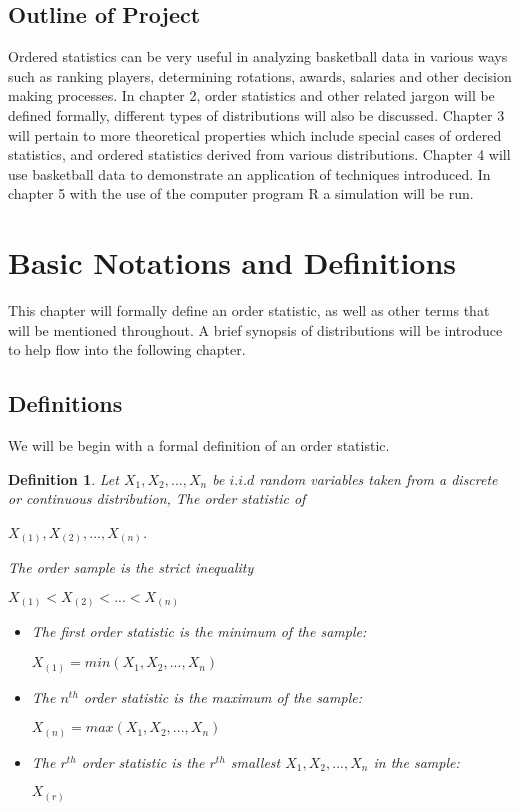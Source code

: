 \documentclass[11pt,a4paper]{article}
\theoremstyle{plain}
\newtheorem{de}[fact]{Definition}
\begin{document}
\subsection{Outline of Project}
Ordered statistics can be very useful in analyzing basketball data in various ways such as ranking players, determining rotations, awards, salaries and other decision making processes. In chapter 2, order statistics and other related jargon will be defined formally, different types of distributions will also be discussed. Chapter 3 will pertain to more theoretical properties which include special cases of ordered statistics, and ordered statistics derived from various distributions. Chapter 4 will use basketball data to demonstrate an application of techniques introduced. In chapter 5 with the use of the computer program R a simulation will be run.

\newpage
\section{Basic Notations and Definitions}
This chapter will formally define an order statistic, as well as other terms that will be mentioned throughout. A brief synopsis of distributions will be introduce to help flow into the following chapter.
\subsection{Definitions}
We will be begin with a formal definition of an order statistic. 
\begin{de}
Let $X_1,X_2,...,X_n$ be $i.i.d$ random variables taken from a discrete or continuous distribution, 
The order statistic of
\begin{center}
 $X_{(1)},X_{(2)},...,X_{(n)}$.
\end{center}
The order sample is the strict inequality
\begin{center}
$X_{(1)}<X_{(2)}<...<X_{(n)}$
\end{center}


\begin{itemize}
\item The first order statistic is the minimum of the sample: 
\begin{center}
$X_{(1)}=min(X_1,X_2,...,X_n)$
\end{center}
\item The $n^{th}$ order statistic is the maximum of the sample:
\begin{center}
$X_{(n)}=max(X_1,X_2,...,X_n)$
\end{center}
\item The $r^{th}$ order statistic is the $r^{th}$ smallest  $X_1,X_2,...,X_n$ in the sample:
\begin{center}
$X_{(r)}$
\end{center}
\end{itemize}
\end{de}
\end{document}
